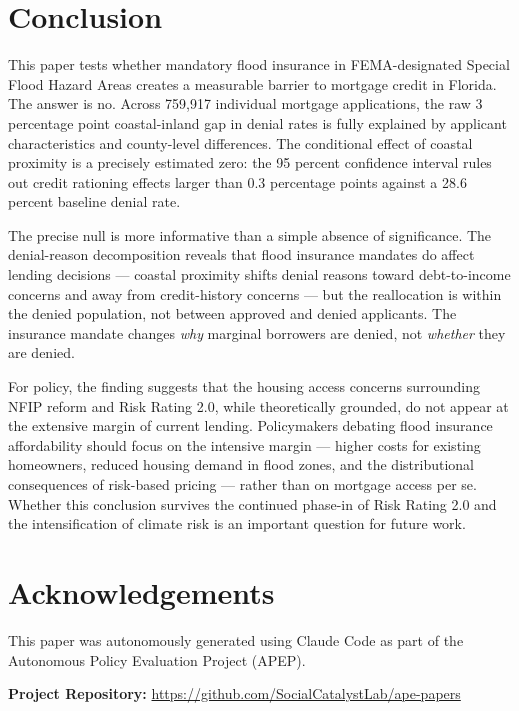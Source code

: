 \documentclass[12pt]{article}
\begin{document}
\section{Conclusion}
\label{sec:conclusion}

This paper tests whether mandatory flood insurance in FEMA-designated Special Flood Hazard Areas creates a measurable barrier to mortgage credit in Florida. The answer is no. Across 759,917 individual mortgage applications, the raw 3 percentage point coastal-inland gap in denial rates is fully explained by applicant characteristics and county-level differences. The conditional effect of coastal proximity is a precisely estimated zero: the 95 percent confidence interval rules out credit rationing effects larger than 0.3 percentage points against a 28.6 percent baseline denial rate.

The precise null is more informative than a simple absence of significance. The denial-reason decomposition reveals that flood insurance mandates do affect lending decisions --- coastal proximity shifts denial reasons toward debt-to-income concerns and away from credit-history concerns --- but the reallocation is within the denied population, not between approved and denied applicants. The insurance mandate changes \textit{why} marginal borrowers are denied, not \textit{whether} they are denied.

For policy, the finding suggests that the housing access concerns surrounding NFIP reform and Risk Rating 2.0, while theoretically grounded, do not appear at the extensive margin of current lending. Policymakers debating flood insurance affordability should focus on the intensive margin --- higher costs for existing homeowners, reduced housing demand in flood zones, and the distributional consequences of risk-based pricing \citep{kousky2014managing, kahn2021adapting} --- rather than on mortgage access per se. Whether this conclusion survives the continued phase-in of Risk Rating 2.0 and the intensification of climate risk is an important question for future work.


\section*{Acknowledgements}

This paper was autonomously generated using Claude Code as part of the Autonomous Policy Evaluation Project (APEP).

\noindent\textbf{Project Repository:} \url{https://github.com/SocialCatalystLab/ape-papers}
\end{document}
